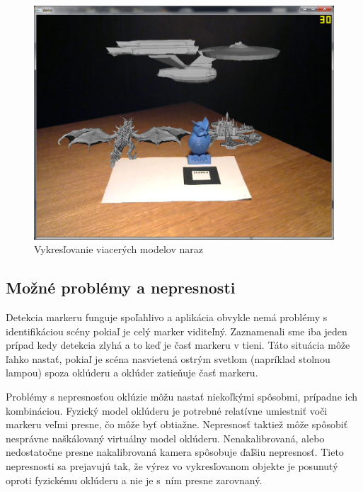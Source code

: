 \begin{figure}[h]
 \centering
 \includegraphics[max width=\textwidth]{pictures/benchmark.png}
 \caption{Vykresľovanie viacerých modelov naraz}
 \label{benchmark}
 \end{figure}
 
 \subsection{Možné problémy a nepresnosti}
 
 Detekcia markeru funguje spoľahlivo a aplikácia obvykle nemá problémy s identifikáciou scény pokiaľ je celý marker viditeľný. Zaznamenali sme iba jeden prípad kedy detekcia zlyhá a to keď je časť markeru v tieni. Táto situácia môže ľahko nastať, pokiaľ je scéna nasvietená ostrým svetlom (napríklad stolnou lampou) spoza oklúderu a oklúder zatieňuje časť markeru.
 
 Problémy s nepresnosťou oklúzie môžu nastať niekoľkými spôsobmi, prípadne ich kombináciou. Fyzický model oklúderu je potrebné relatívne umiestniť voči markeru veľmi presne, čo môže byť obtiažne. Nepresnosť taktiež môže spôsobiť nesprávne naškálovaný virtuálny model oklúderu. Nenakalibrovaná, alebo nedostatočne presne nakalibrovaná kamera spôsobuje ďaľšiu nepresnosť. Tieto nepresnosti sa prejavujú tak, že výrez vo vykresľovanom objekte je posunutý oproti fyzickému oklúderu a nie je s~ním presne zarovnaný.
